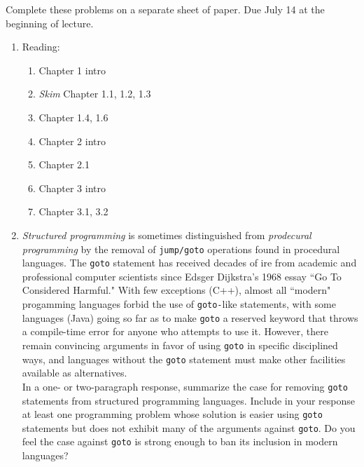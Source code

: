 \documentclass[9pt]{article}
\begin{document}
\noindent Complete these problems on a separate sheet of paper. Due July 14 at
the beginning of lecture.
\begin{enumerate}
   \item Reading:

         \begin{enumerate}
            \item Chapter 1 intro
            \item \textit{Skim} Chapter 1.1, 1.2, 1.3
            \item Chapter 1.4, 1.6
            \item Chapter 2 intro
            \item Chapter 2.1
            \item Chapter 3 intro
            \item Chapter 3.1, 3.2
         \end{enumerate}
   \item \textit{Structured programming} is sometimes distinguished from
         \textit{prodecural programming} by the removal of \verb|jump/goto|
         operations found in procedural languages. The \verb|goto| statement has
         received decades of ire from academic and professional computer
         scientists since Edsger Dijkstra's 1968 essay ``Go To Considered
         Harmful." With few exceptions (C++), almost all ``modern" progamming
         languages forbid the use of \verb|goto-|like statements, with some
         languages (Java) going so far as to make \verb|goto| a reserved keyword
         that throws a compile-time error for anyone who attempts to use it.
         However, there remain convincing arguments in favor of using
         \verb|goto| in specific disciplined ways, and languages without the
         \verb|goto| statement must make other facilities available as 
         alternatives. \\

         In a one- or two-paragraph response, summarize the case for removing
         \verb|goto| statements from structured programming languages. Include
         in your response at least one programming problem whose solution is
         easier using \verb|goto| statements but does not exhibit many of the
         arguments against \verb|goto|. Do you feel the case against \verb|goto|
         is strong enough to ban its inclusion in modern languages?
         

\end{enumerate}
\end{document}
